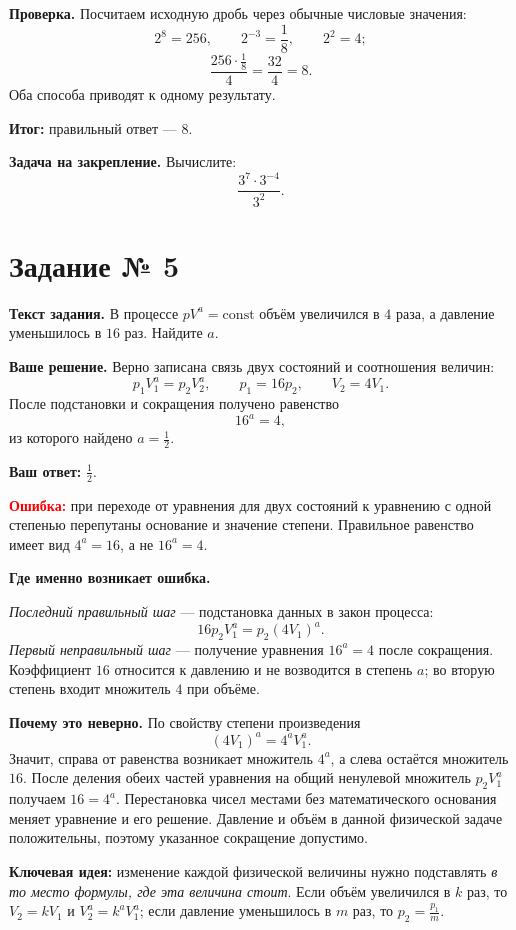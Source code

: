 \documentclass[12pt,a4paper]{article}
\begin{document}
\textbf{Проверка.} Посчитаем исходную дробь через обычные числовые значения:
\[
2^8=256,\qquad 2^{-3}=\frac18,\qquad 2^2=4;
\]
\[
\frac{256\cdot\frac18}{4}=\frac{32}{4}=8.
\]
Оба способа приводят к одному результату.

\textcolor{teal!60!black}{\textbf{Итог:}} правильный ответ --- $\boxed{8}$.

\textbf{Задача на закрепление.} Вычислите:
\[
\frac{3^7\cdot3^{-4}}{3^2}.
\]

\newpage
{}\label{task:5}
\section*{Задание № 5}
\textbf{Текст задания.} В процессе $pV^a=\mathrm{const}$ объём увеличился в $4$ раза, а давление уменьшилось в $16$ раз. Найдите $a$.

\textbf{Ваше решение.} Верно записана связь двух состояний и соотношения величин:
\[
p_1V_1^a=p_2V_2^a,\qquad
p_1=16p_2,\qquad V_2=4V_1.
\]
После подстановки и сокращения получено равенство
\[
16^a=4,
\]
из которого найдено $a=\frac12$.

\textbf{Ваш ответ:} $\frac12$.

\textcolor{red}{\textbf{Ошибка:}} при переходе от уравнения для двух состояний к уравнению с одной степенью перепутаны основание и значение степени. Правильное равенство имеет вид $4^a=16$, а не $16^a=4$.

\textbf{Где именно возникает ошибка.}

\emph{Последний правильный шаг} --- подстановка данных в закон процесса:
\[
16p_2V_1^a=p_2(4V_1)^a.
\]
\emph{Первый неправильный шаг} --- получение уравнения $16^a=4$ после сокращения. Коэффициент $16$ относится к давлению и не возводится в степень $a$; во вторую степень входит множитель $4$ при объёме.

\textbf{Почему это неверно.} По свойству степени произведения
\[
(4V_1)^a=4^a V_1^a.
\]
Значит, справа от равенства возникает множитель $4^a$, а слева остаётся множитель $16$. После деления обеих частей уравнения на общий ненулевой множитель $p_2V_1^a$ получаем $16=4^a$. Перестановка чисел местами без математического основания меняет уравнение и его решение. Давление и объём в данной физической задаче положительны, поэтому указанное сокращение допустимо.

\textcolor{blue!60!black}{\textbf{Ключевая идея:}} изменение каждой физической величины нужно подставлять \emph{в то место формулы, где эта величина стоит}. Если объём увеличился в $k$ раз, то $V_2=kV_1$ и $V_2^a=k^a V_1^a$; если давление уменьшилось в $m$ раз, то $p_2=\frac{p_1}{m}$.
\end{document}
